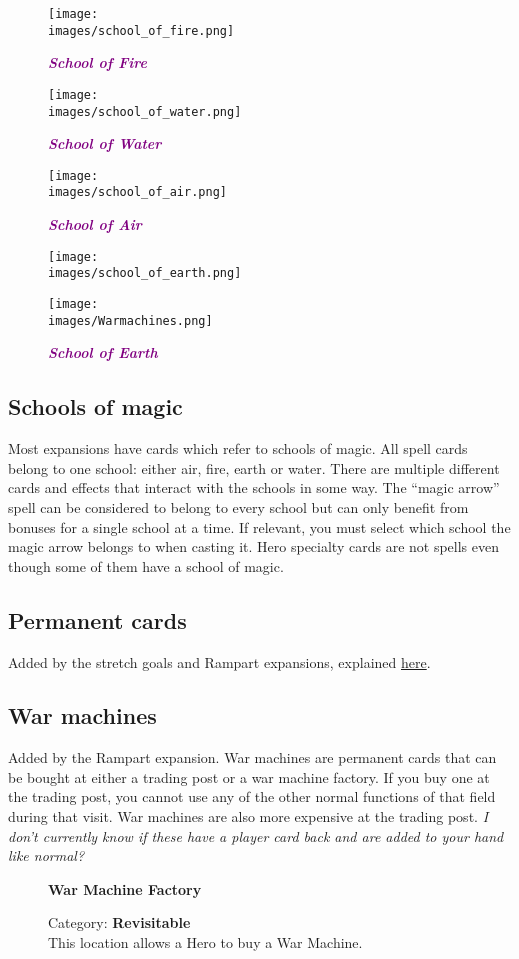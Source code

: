 \begin{wrapfigure}{R}{0.5\textwidth}
  \begin{center}
      \centering
      \texttt{[image: \\images/school\_of\_fire.png]}
      \caption{{\textit{\textbf{\textcolor{purple}{School of Fire}}}}}
    \endminipage
      \centering
      \texttt{[image: \\images/school\_of\_water.png]}
      \caption{{\textit{\textbf{\textcolor{purple}{School of Water}}}}}
    \endminipage
    \hfill\allowbreak%
      \centering
      \texttt{[image: \\images/school\_of\_air.png]}
      \caption{{\textit{\textbf{\textcolor{purple}{School of Air}}}}}
    \endminipage
      \centering
      \texttt{[image: \\images/school\_of\_earth.png]}
      \caption{{\textit{\textbf{\textcolor{purple}{School of Earth}}}}}
    \endminipage
    \hfill\allowbreak%
    \bigbreak
    \texttt{[image: \\images/Warmachines.png]}
  \end{center}
\end{wrapfigure}
\subsection*{Schools of magic}
Most expansions have cards which refer to schools of magic.
All spell cards belong to one school: either air, fire, earth or water.
There are multiple different cards and effects that interact with the schools in some way.
The “magic arrow” spell can be considered to belong to every school but can only benefit from bonuses for a single school at a time.
If relevant, you must select which school the magic arrow belongs to when casting it.
Hero specialty cards are not spells even though some of them have a school of magic.
\subsection*{Permanent cards}
Added by the stretch goals and Rampart expansions, explained \hyperlink{Playerdecks}{here}.
\subsection*{War machines}
Added by the Rampart expansion.
War machines are permanent cards that can be bought at either a trading post or a war machine factory.
If you buy one at the trading post, you cannot use any of the other normal functions of that field during that visit.
War machines are also more expensive at the trading post.
\textit{I don't currently know if these have a player card back and are added to your hand like normal?}\par
\begin{wrapfigure}{r}{0.4\textwidth}
  \textbf{War Machine Factory}\\
  \caption{Category: \textbf{Revisitable}\\This location allows a Hero to buy a War Machine.}
\end{wrapfigure}

